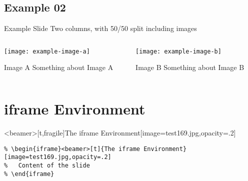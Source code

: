 \documentclass[aspectratio=169]{beamer}
\begin{document}
\subsection{Example 02}

\begin{frame}[t]{Example Slide }{Two columns, with 50/50 split including images}

  \begin{columns}[T]
    \begin{column}{.5\textwidth}

      \texttt{[image: example-image-a]}

      \begin{exampleblock}{Image A}
        Something about \alert{Image A}
      \end{exampleblock}

    \end{column}

    \begin{column}{.5\textwidth}

      \texttt{[image: example-image-b]}

      \begin{alertblock}{Image B}
        Something about \alert{Image B}
      \end{alertblock}

    \end{column}
  \end{columns}

\end{frame}


\section{iframe Environment}

\begin{iframe}<beamer>[t,fragile]{The iframe Environment}[image=test169.jpg,opacity=.2]
  \begin{example}
    \begin{lstlisting}
% \begin{iframe}<beamer>[t]{The iframe Environment}[image=test169.jpg,opacity=.2]
%   Content of the slide
% \end{iframe}
    \end{lstlisting}
  \end{example}
\end{iframe}
\end{document}
